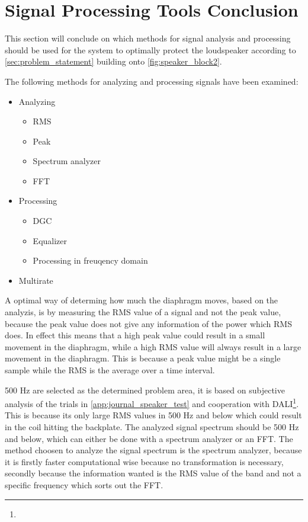 \section{Signal Processing Tools Conclusion}
This section will conclude on which methods for signal analysis and processing should be used for the system to optimally protect the loudspeaker according to \autoref{sec:problem_statement} building onto \autoref{fig:speaker_block2}.

The following methods for analyzing and processing signals have been examined:
\begin{itemize}
\item Analyzing
\begin{itemize}
\item RMS
\item Peak
\item Spectrum analyzer
\item FFT
\end{itemize}
\item Processing
\begin{itemize}
\item DGC
\item Equalizer
\item Processing in freuqency domain
\end{itemize}
\item Multirate
\end{itemize}

A optimal way of determing how much the diaphragm moves, based on the analyzis, is by measuring the RMS value of a signal and not the peak value, because the peak value does not give any information of the power which RMS does. In effect this means that a high peak value could result in a small movement in the diaphragm, while a high RMS value will always result in a large movement in the diaphragm. This is because a peak value might be a single sample while the RMS is the average over a time interval. 

500 Hz are selected as the determined problem area, it is based on subjective analysis of the trials in \autoref{app:journal_speaker_test} and cooperation with DALI\footnote{}. This is because its only large RMS values in 500 Hz and below which could result in the coil hitting the backplate. The analyzed signal spectrum should be 500 Hz and below, which can either be done with a spectrum analyzer or an FFT. The method choosen to analyze the signal spectrum is the spectrum analyzer, because it is firstly faster computational wise because no transformation is necessary, secondly because the information wanted is the RMS value of the band and not a specific frequency which sorts out the FFT.   %

